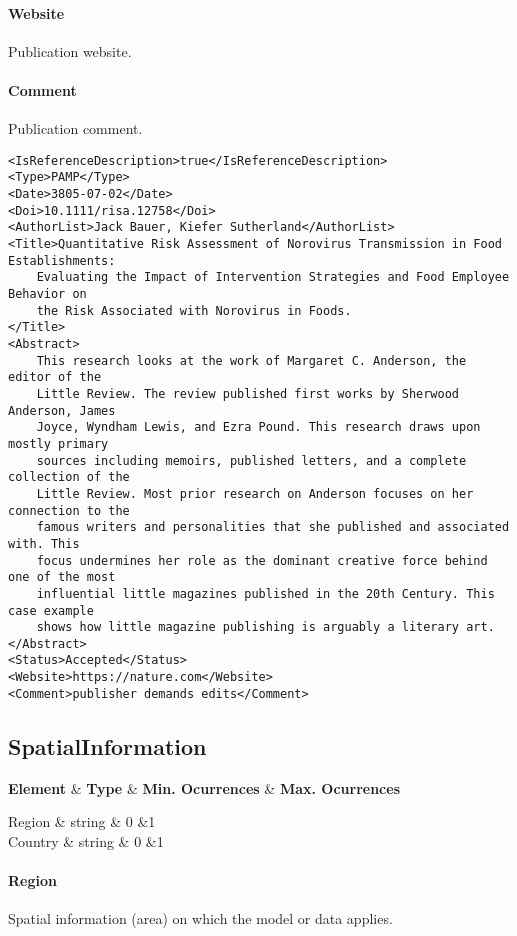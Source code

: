 \documentclass[a4paper]{report}
\def\starttable{%
    \tabular{|l|c|c|c|}
    \hline
    \textbf{Element} & \textbf{Type} & \textbf{Min. Ocurrences} & \textbf{Max. Ocurrences} \\    
    \hline
}
\def\stoptable{%
    \hline \endtabular
}
\def\R #1|#2|#3|#4{ #1&#2&#3&#4 \\}
\begin{document}
\paragraph{Website}
Publication website.

\paragraph{Comment}
Publication comment.

\begin{lstlisting}[language=RAKIP, caption={Example of Reference}]
<IsReferenceDescription>true</IsReferenceDescription>
<Type>PAMP</Type>
<Date>3805-07-02</Date>
<Doi>10.1111/risa.12758</Doi>
<AuthorList>Jack Bauer, Kiefer Sutherland</AuthorList>
<Title>Quantitative Risk Assessment of Norovirus Transmission in Food Establishments:
    Evaluating the Impact of Intervention Strategies and Food Employee Behavior on
    the Risk Associated with Norovirus in Foods.
</Title>
<Abstract>
    This research looks at the work of Margaret C. Anderson, the editor of the
    Little Review. The review published first works by Sherwood Anderson, James
    Joyce, Wyndham Lewis, and Ezra Pound. This research draws upon mostly primary
    sources including memoirs, published letters, and a complete collection of the
    Little Review. Most prior research on Anderson focuses on her connection to the
    famous writers and personalities that she published and associated with. This
    focus undermines her role as the dominant creative force behind one of the most
    influential little magazines published in the 20th Century. This case example
    shows how little magazine publishing is arguably a literary art.
</Abstract>
<Status>Accepted</Status>
<Website>https://nature.com</Website>
<Comment>publisher demands edits</Comment>
\end{lstlisting}

\subsection{SpatialInformation}
\label{class:SpatialInformation}

\starttable
    \R Region | string | 0 | 1
    \R Country | string | 0 | 1
\stoptable

\paragraph{Region}
Spatial information (area) on which the model or data applies.
\end{document}
